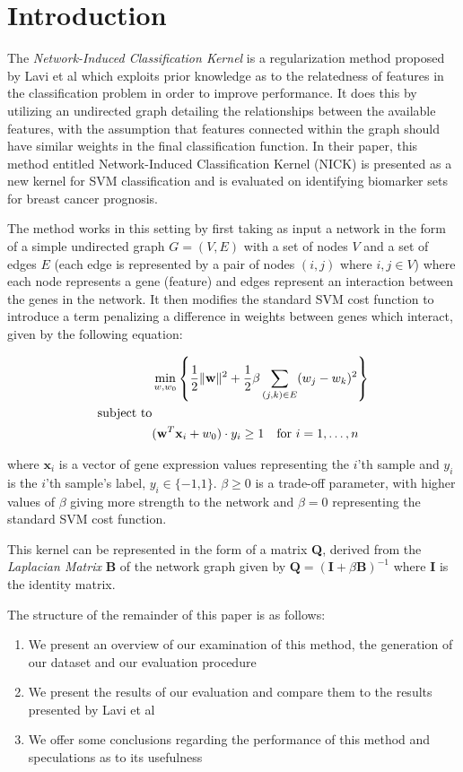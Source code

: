 \section{Introduction}

The \textit{Network-Induced Classification Kernel} is a regularization method proposed by Lavi et al\cite{Lavi2012} which exploits prior knowledge as to the relatedness of features in the classification problem in order to improve performance.  It does this by utilizing an undirected graph detailing the relationships between the available features, with the assumption that features connected within the graph should have similar weights in the final classification function.  In their paper, this method entitled Network-Induced Classification Kernel (NICK) is presented as a new kernel for SVM classification and is evaluated on identifying biomarker sets for breast cancer prognosis.
	
The method works in this setting by first taking as input a network in the form of a simple
undirected graph $G = (V, E)$ with a set of nodes $V$ and a set of edges $E$ (each edge is represented by a pair of nodes $(i, j)$ where $i, j \in V$) where each node represents a gene (feature) and edges represent an interaction between the genes in the network. It then modifies the standard SVM cost function to introduce a term penalizing a difference in weights between genes which interact, given by the following equation:

\begin{align*}
	& \min_{w,w_0}
	  \left\lbrace 
	  \frac{1}{2}\|\textbf{w}\|^2 + 
	  \frac{1}{2}\beta \sum_{(j,k) \in E} (w_j - w_k)^2 
	  \right\rbrace \\
	\text{subject to} \hfill \\
	& (\textbf{w}^T\textbf{x}_i + w_0) \cdot y_i \geq 1 \quad \text{for } i = 1, \ldots , n
\end{align*}

\noindent where $\textbf{x}_i$ is a vector of gene expression values representing the $i$’th sample and $y_i$ is the $i$’th sample’s label, $y_i \in \{ - 1‚ 1 \}$. $\beta \geq 0$ is a trade-off parameter, with higher values of $\beta$ giving more strength to the network and $\beta = 0$ representing the standard SVM cost function.

This kernel can be represented in the form of a matrix \textbf{Q}, derived from the \textit{Laplacian Matrix} \textbf{B} of the network graph given by $\textbf{Q} = (\textbf{I} + \beta\textbf{B})^{-1}$ where \textbf{I} is the identity matrix.

The structure of the remainder of this paper is as follows:
\begin{enumerate}
	\item We present an overview of our examination of this method, the generation of our dataset and our evaluation procedure
	\item We present the results of our evaluation and compare them to the results presented by Lavi et al
	\item We offer some conclusions regarding the performance of this method and speculations as to its usefulness
\end{enumerate}
